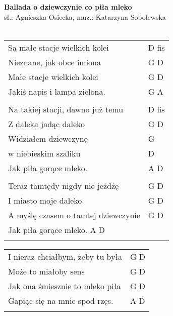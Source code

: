 \documentclass[a5paper]{article}
\begin{document}


\noindent
\fontsize{12pt}{15pt}\selectfont
\textbf{Ballada o dziewczynie co piła mleko} \\
\fontsize{8pt}{10pt}\selectfont
sł.: Agnieszka Osiecka, muz.: Katarzyna Sobolewska\\ \\
\fontsize{10pt}{12pt}\selectfont
{}
\begin{tabular}{@{}p{8.5cm}p{3cm}@{}}
\noindent
Są małe stacje wielkich kolei & D fis \\
Nieznane, jak obce imiona & G D \\
Małe stacje wielkich kolei & G D \\
Jakiś napis i lampa zielona. & G A \\ \\

Na takiej stacji, dawno już temu & D fis \\
Z daleka jadąc daleko & G D \\
Widziałem dziewczynę & G \\
w niebieskim szaliku & D \\
Jak piła gorące mleko. & A D \\ \\

Teraz tamtędy nigdy nie jeżdżę & G D \\
I miasto moje daleko & G D \\
A myślę czasem o tamtej dziewczynie & G D \\
Jak piła gorące mleko. A D \\ \\
\end{tabular}

\noindent
\begin{tabular}{@{}p{7.5cm}p{3cm}@{}}
I nieraz chciałbym, żeby tu była & G D \\
Może to miałoby sens & G D \\
Jak ona śmiesznie to mleko piła & G D \\
Gapiąc się na mnie spod rzęs. & A D \\ \\
\end{tabular}
\end{document}
